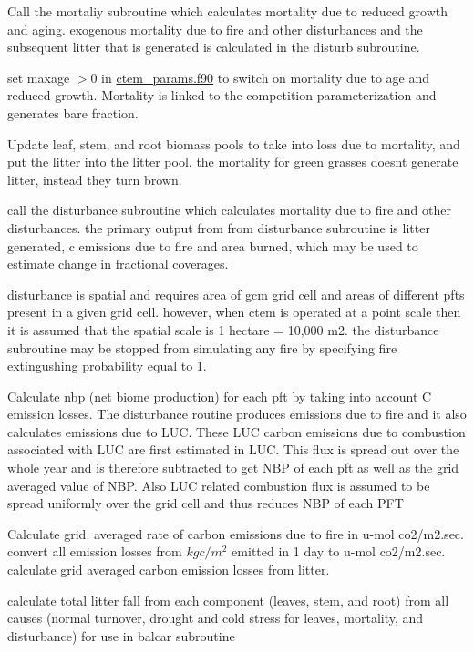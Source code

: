 Call the mortaliy subroutine which calculates mortality due to reduced growth and aging. exogenous mortality due to fire and other disturbances and the subsequent litter that is generated is calculated in the disturb subroutine.

set maxage $>$0 in \hyperlink{ctem__params_8f90}{ctem\+\_\+params.\+f90} to switch on mortality due to age and reduced growth. Mortality is linked to the competition parameterization and generates bare fraction.

Update leaf, stem, and root biomass pools to take into loss due to mortality, and put the litter into the litter pool. the mortality for green grasses doesn\textquotesingle{}t generate litter, instead they turn brown.

call the disturbance subroutine which calculates mortality due to fire and other disturbances. the primary output from from disturbance subroutine is litter generated, c emissions due to fire and area burned, which may be used to estimate change in fractional coverages.

disturbance is spatial and requires area of gcm grid cell and areas of different pfts present in a given grid cell. however, when ctem is operated at a point scale then it is assumed that the spatial scale is 1 hectare = 10,000 m2. the disturbance subroutine may be stopped from simulating any fire by specifying fire extingushing probability equal to 1.

Calculate nbp (net biome production) for each pft by taking into account C emission losses. The disturbance routine produces emissions due to fire and it also calculates emissions due to L\+U\+C. These L\+U\+C carbon emissions due to combustion associated with L\+U\+C are first estimated in L\+U\+C. This flux is spread out over the whole year and is therefore subtracted to get N\+B\+P of each pft as well as the grid averaged value of N\+B\+P. Also L\+U\+C related combustion flux is assumed to be spread uniformly over the grid cell and thus reduces N\+B\+P of each P\+F\+T

Calculate grid. averaged rate of carbon emissions due to fire in u-\/mol co2/m2.\+sec. convert all emission losses from $kg c/m^2$ emitted in 1 day to u-\/mol co2/m2.\+sec. calculate grid averaged carbon emission losses from litter.

calculate total litter fall from each component (leaves, stem, and root) from all causes (normal turnover, drought and cold stress for leaves, mortality, and disturbance) for use in balcar subroutine

